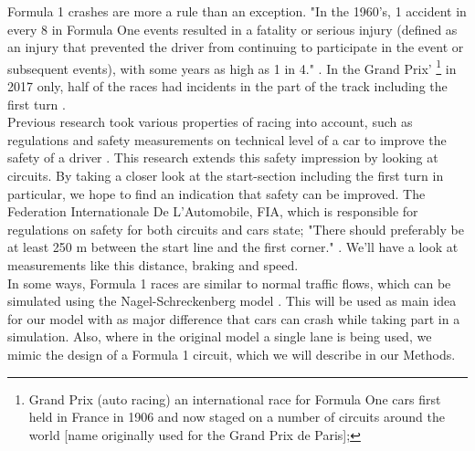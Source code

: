 Formula 1 crashes are more a rule than an exception. "In the 1960’s, 1 accident in every 8 in Formula One events resulted in a fatality or serious injury (defined as an injury that prevented the driver from continuing to participate in the event or subsequent events), with some years as high as 1 in 4." \cite{motorsports-safety}. In the Grand Prix' \footnote{Grand Prix (auto racing) an international race for Formula One cars first held in France in 1906 and now staged on a number of circuits around the world [name originally used for the Grand Prix de Paris];\cite{grand-prix}} in 2017 only, half of the races had incidents in the part of the track including the first turn \cite{som}.\\
Previous research took various properties of racing into account, such as regulations and safety measurements on technical level of a car \cite{stanford} to improve the safety of a driver \cite{safety-review}. This research extends this safety impression by looking at circuits. By taking a closer look at the start-section including the first turn in particular, we hope to find an indication that safety can be improved. The Federation Internationale De L'Automobile, FIA, which is responsible for regulations on safety for both circuits and cars state; "There should preferably be at least 250 m between the start line and the first corner." \cite{fia-starting-straight}. We'll have a look at measurements like this distance, braking and speed.\\
In some ways, Formula 1 races are similar to normal traffic flows, which can be simulated using the Nagel-Schreckenberg model \cite{nagel-schreckenberg}. This will be used as main idea for our model with as major difference that cars can crash while taking part in a simulation. Also, where in the original model a single lane is being used, we mimic the design of a Formula 1 circuit, which we will describe in our Methods.\\


